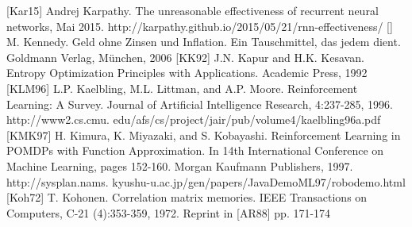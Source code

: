 \documentclass[10pt]{book}
\begin{document}
[Kar15] Andrej Karpathy. The unreasonable effectiveness of recurrent neural networks, Mai 2015. http://karpathy.github.io/2015/05/21/rnn-effectiveness/
[\cite{kennedy2006geld}] M. Kennedy. Geld ohne Zinsen und Inflation. Ein Tauschmittel, das jedem dient. Goldmann Verlag, München, 2006
[KK92] J.N. Kapur and H.K. Kesavan. Entropy Optimization Principles with Applications. Academic Press, 1992
[KLM96] L.P. Kaelbling, M.L. Littman, and A.P. Moore. Reinforcement Learning: A Survey. Journal of Artificial Intelligence Research, 4:237-285, 1996. http://www2.cs.cmu. edu/afs/cs/project/jair/pub/volume4/kaelbling96a.pdf
[KMK97] H. Kimura, K. Miyazaki, and S. Kobayashi. Reinforcement Learning in POMDPs with Function Approximation. In 14th International Conference on Machine Learning, pages 152-160. Morgan Kaufmann Publishers, 1997. http://sysplan.nams. kyushu-u.ac.jp/gen/papers/JavaDemoML97/robodemo.html
[Koh72] T. Kohonen. Correlation matrix memories. IEEE Transactions on Computers, C-21 (4):353-359, 1972. Reprint in [AR88] pp. 171-174
\end{document}
